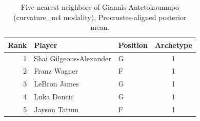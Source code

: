 \begin{table}[htbp]
  \centering\small
  \begin{tabular}{rllc}
    \toprule
    Rank & Player & Position & Archetype \\
    \midrule
    1 & Shai Gilgeous-Alexander & G & 1 \\
    2 & Franz Wagner & F & 1 \\
    3 & LeBron James & G & 1 \\
    4 & Luka Doncic & G & 1 \\
    5 & Jayson Tatum & F & 1 \\
    \bottomrule
  \end{tabular}
  \caption{Five nearest neighbors of Giannis Antetokounmpo (curvature_m4 modality), Procrustes-aligned posterior mean.}
  \label{tab:Giannis_Antetokounmpo_neighbors_curvature_m4}
\end{table}

